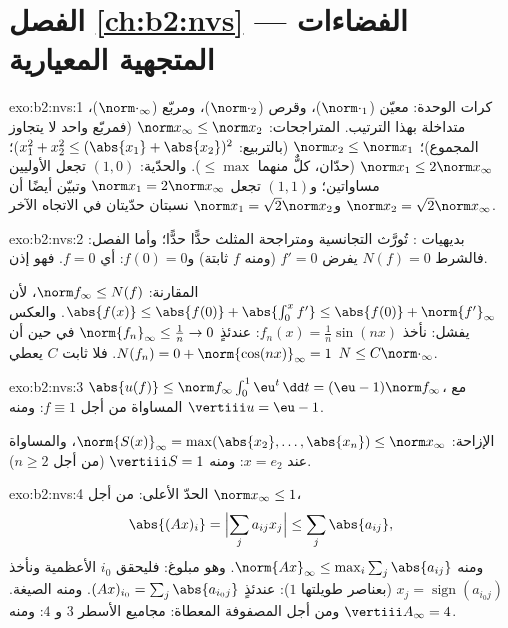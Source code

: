 \section*{الفصل \ref{ch:b2:nvs} --- الفضاءات المتجهية المعيارية}

\begin{solution}{exo:b2:nvs:1}
كرات الوحدة: معيّن ($\norm\cdot_1$)، وقرص ($\norm\cdot_2$)، ومربّع
($\norm\cdot_\infty$)، متداخلة بهذا الترتيب. المتراجحات:
$\norm x_\infty \leq \norm x_2$ (فمربّع واحد لا يتجاوز المجموع)؛
$\norm x_2 \leq \norm x_1$ (بالتربيع: $x_1^2 + x_2^2 \leq (\abs{x_1}
+ \abs{x_2})^2$)؛ $\norm x_1 \leq 2\norm x_\infty$ (حدّان، كلٌّ منهما
$\leq \max$). والحدّية: $(1, 0)$ تجعل الأوليين مساواتين؛
و$(1, 1)$ تجعل $\norm x_1 = 2\norm x_\infty$ وتبيّن أيضًا أن
$\norm x_2 = \sqrt2 \norm x_\infty$ و$\norm x_1 = \sqrt2 \norm
x_2$ نسبتان حدّيتان في الاتجاه الآخر.
\end{solution}

\begin{solution}{exo:b2:nvs:2}
بديهيات : تُورَّث التجانسية ومتراجحة المثلث
حدًّا حدًّا؛ وأما الفصل: فالشرط $N(f) = 0$ يفرض $f' = 0$ (ومنه $f$ ثابتة)
و$f(0) = 0$: أي $f = 0$. فهو  إذن.

المقارنة: $\norm f_\infty \leq N(f)$، لأن $\abs{f(x)} \leq
\abs{f(0)} + \abs{\int_0^x f'} \leq \abs{f(0)} +
\norm{f'}_\infty$. والعكس يفشل: نأخذ $f_n(x) = \frac1n
\sin(nx)$: عندئذٍ $\norm{f_n}_\infty \leq \frac1n \to 0$ في حين أن
$N(f_n) = 0 + \norm{\cos(nx)}_\infty = 1$. فلا ثابت $C$ يعطي
$N \leq C\norm\cdot_\infty$.
\end{solution}

\begin{solution}{exo:b2:nvs:3}
$\abs{u(f)} \leq \norm f_\infty \int_0^1 \eu^t\,\dd t = (\eu -
1)\norm f_\infty$، مع المساواة من أجل $f \equiv 1$: ومنه $\vertiii u =
\eu - 1$.

الإزاحة: $\norm{S(x)}_\infty = \max(\abs{x_2}, \dots, \abs{x_n}) \leq
\norm x_\infty$، والمساواة عند $x = e_2$: ومنه $\vertiii S = 1$ (من أجل $n
\geq 2$).
\end{solution}

\begin{solution}{exo:b2:nvs:4}
الحدّ الأعلى: من أجل $\norm x_\infty \leq 1$،
\[
\abs{(Ax)_i} = \Bigl|\sum_j a_{ij}x_j\Bigr| \leq \sum_j
\abs{a_{ij}},
\]
ومنه $\norm{Ax}_\infty \leq \max_i \sum_j \abs{a_{ij}}$. وهو مبلوغ: فليحقق
$i_0$ الأعظمية ونأخذ $x_j = \operatorname{sign}(a_{i_0
j})$ (بعناصر طويلتها $1$): عندئذٍ $(Ax)_{i_0} = \sum_j \abs{a_{i_0
j}}$. ومنه الصيغة. ومن أجل المصفوفة المعطاة: مجاميع الأسطر $3$ و
$4$: ومنه $\vertiii A_\infty = 4$.
\end{solution}

